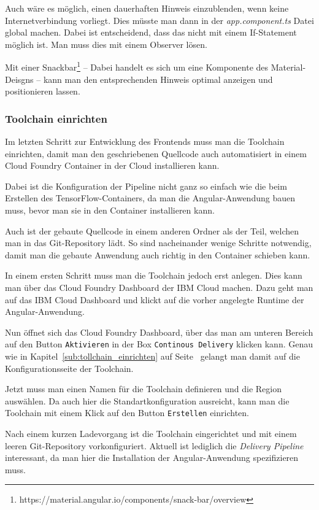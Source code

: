 Auch wäre es möglich, einen dauerhaften Hinweis einzublenden, wenn keine Internetverbindung vorliegt. Dies müsste man
dann in der \textit{app.component.ts} Datei global machen. Dabei ist entscheidend, dass das nicht mit einem If-Statement
möglich ist. Man muss dies mit einem Observer lösen.

Mit einer Snackbar\footnote{https://material.angular.io/components/snack-bar/overview} -- Dabei handelt es sich um eine
Komponente des Material-Deisgns -- kann man den entsprechenden Hinweis optimal anzeigen und positionieren lassen.

\subsubsection{Toolchain einrichten}
\label{subsec:toolchain_einrichten}
Im letzten Schritt zur Entwicklung des Frontends muss man die Toolchain einrichten, damit man den geschriebenen
Quellcode auch automatisiert in einem Cloud Foundry Container in der Cloud installieren kann.

Dabei ist die Konfiguration der Pipeline nicht ganz so einfach wie die beim Erstellen des TensorFlow-Containers, da man
die Angular-Anwendung bauen muss, bevor man sie in den Container installieren kann.

Auch ist der gebaute Quellcode in einem anderen Ordner als der Teil, welchen man in das Git-Repository lädt. So sind
nacheinander wenige Schritte notwendig, damit man die gebaute Anwendung auch richtig in den Container schieben kann.

In einem ersten Schritt muss man die Toolchain jedoch erst anlegen. Dies kann man über das Cloud Foundry Dashboard der
IBM Cloud machen. Dazu geht man auf das IBM Cloud Dashboard und klickt auf die vorher angelegte Runtime der
Angular-Anwendung.

Nun öffnet sich das Cloud Foundry Dashboard, über das man am unteren Bereich auf den Button \texttt{Aktivieren} in der
Box \texttt{Continous Delivery} klicken kann. Genau wie in Kapitel~\ref{sub:tollchain_einrichten} auf
Seite~\pageref{sub:tollchain_einrichten} gelangt man damit auf die Konfigurationsseite der Toolchain.

Jetzt muss man einen Namen für die Toolchain definieren und die Region auswählen. Da auch hier die Standartkonfiguration
ausreicht, kann man die Toolchain mit einem Klick auf den Button \texttt{Erstellen} einrichten.

Nach einem kurzen Ladevorgang ist die Toolchain eingerichtet und mit einem leeren Git-Repository vorkonfiguriert.
Aktuell ist lediglich die \textit{Delivery Pipeline} interessant, da man hier die Installation der Angular-Anwendung
spezifizieren muss.

